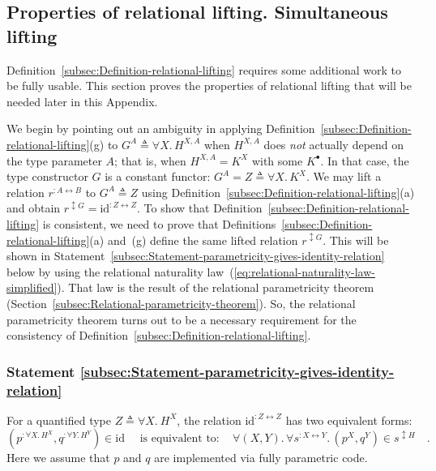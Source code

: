 \subsection{Properties of relational lifting. Simultaneous lifting}

Definition~\ref{subsec:Definition-relational-lifting} requires some
additional work to be fully usable. This section proves the properties
of relational lifting that will be needed later in this Appendix.

We begin by pointing out an ambiguity in applying Definition~\ref{subsec:Definition-relational-lifting}(g)
to $G^{A}\triangleq\forall X.\,H^{X,A}$ when $H^{X,A}$ does \emph{not}
actually depend on the type parameter $A$; that is, when $H^{X,A}=K^{X}$
with some $K^{\bullet}$. In that case, the type constructor $G$
is a constant functor: $G^{A}=Z\triangleq\forall X.\,K^{X}$. We may
lift a relation $r^{:A\leftrightarrow B}$ to $G^{A}\triangleq Z$
using Definition~\ref{subsec:Definition-relational-lifting}(a) and
obtain $r^{\updownarrow G}=\text{id}^{:Z\leftrightarrow Z}$. To show
that Definition~\ref{subsec:Definition-relational-lifting} is consistent,
we need to prove that Definitions~\ref{subsec:Definition-relational-lifting}(a)
and~(g) define the same lifted relation $r^{\updownarrow G}$. This
will be shown in Statement~\ref{subsec:Statement-parametricity-gives-identity-relation}
below by using the relational naturality law~(\ref{eq:relational-naturality-law-simplified}).
That law is the result of the relational parametricity theorem (Section~\ref{subsec:Relational-parametricity-theorem}).
So, the relational parametricity theorem turns out to be a necessary
requirement for the consistency of Definition~\ref{subsec:Definition-relational-lifting}.

\subsubsection{Statement \label{subsec:Statement-parametricity-gives-identity-relation}\ref{subsec:Statement-parametricity-gives-identity-relation}}

For a quantified type $Z\triangleq\forall X.\ H^{X}$, the relation
$\text{id}^{:Z\leftrightarrow Z}$ has two equivalent forms:
\[
(p^{:\forall X.\,H^{X}},q^{:\forall Y.\,H^{Y}})\in\text{id}\quad\text{ is equivalent to}:\quad\forall(X,Y).\,\forall s^{:X\leftrightarrow Y}.\,(p^{X},q^{Y})\in s^{\updownarrow H}\quad.
\]
Here we assume that $p$ and $q$ are implemented via fully parametric
code.

